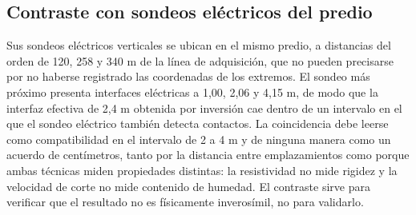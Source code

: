 \subsection{Contraste con sondeos eléctricos del predio}
\label{sec:contraste-sondeos}

 Sus sondeos eléctricos verticales se ubican en el mismo predio, a distancias del orden de 120, 258 y 340 m de la línea de adquisición, que no pueden precisarse por no haberse registrado las coordenadas de los extremos. El sondeo más próximo presenta interfaces eléctricas a 1,00, 2,06 y 4,15 m, de modo que la interfaz efectiva de 2,4 m obtenida por inversión cae dentro de un intervalo en el que el sondeo eléctrico también detecta contactos. La coincidencia debe leerse como compatibilidad en el intervalo de 2 a 4 m y de ninguna manera como un acuerdo de centímetros, tanto por la distancia entre emplazamientos como porque ambas técnicas miden propiedades distintas: la resistividad no mide rigidez y la velocidad de corte no mide contenido de humedad. El contraste sirve para verificar que el resultado no es físicamente inverosímil, no para validarlo.


